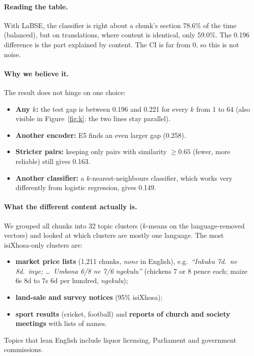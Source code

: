 \documentclass[11pt,a4paper]{article}
\begin{document}
\paragraph{Reading the table.} With LaBSE, the classifier is right about a chunk's section 78.6\% of the
time (balanced), but on translations, where content is identical, only 59.0\%. The 0.196 difference is
the part explained by content. The CI is far from 0, so this is not noise.

\paragraph{Why we believe it.} The result does not hinge on one choice:
\begin{itemize}
  \item \textbf{Any $k$:} the test gap is between 0.196 and 0.221 for every $k$ from 1 to 64 (also visible in
  Figure~\ref{fig:k}: the two lines stay parallel).
  \item \textbf{Another encoder:} E5 finds an even larger gap (0.258).
  \item \textbf{Stricter pairs:} keeping only pairs with similarity $\geq 0.65$ (fewer, more reliable)
  still gives 0.163.
  \item \textbf{Another classifier:} a $k$-nearest-neighbours classifier, which works very differently
  from logistic regression, gives 0.149.
\end{itemize}

\paragraph{What the different content actually is.} We grouped all chunks into 32 topic clusters
($k$-means on the language-removed vectors) and looked at which clusters are mostly one language. The most
isiXhosa-only clusters are:
\begin{itemize}
  \item \textbf{market price lists} (1{,}211 chunks, \emph{none} in English), e.g.\ \emph{``Inkuku 7d.\ ne 8d.\
  inye; \dots\ Umbona 6/8 ne 7/6 ngekulu''} (chickens 7 or 8 pence each; maize 6s 8d to 7s 6d per hundred, \emph{ngekulu});
  \item \textbf{land-sale and survey notices} (95\% isiXhosa);
  \item \textbf{sport results} (cricket, football) and \textbf{reports of church and society meetings} with
  lists of names.
\end{itemize}
Topics that lean English include liquor licensing, Parliament and government commissions.
\end{document}
